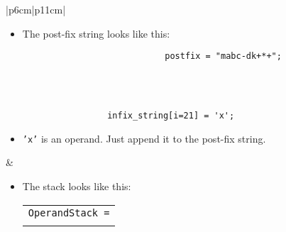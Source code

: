 \begin{center}
\begin{longtable}{ |p{6cm}|p{11cm}| }
\begin{itemize}
                \item The post-fix string looks like this:
                    {
                        \begin{verbatim}
                            postfix = "mabc-dk+*+";
                        \end{verbatim}
                    }
            \end{itemize}
        \\
        \hline 
        \hline
         \\
        \hline
        \hline        
            {
                \begin{verbatim}
                    infix_string[i=21] = 'x';
                \end{verbatim}
            }
            \begin{itemize}
                \item \texttt{'x'} is an operand. Just append it to the post-fix string.
            \end{itemize}
            &
            \begin{itemize}
                \item The stack looks like this: 
                    {
                        \begin{tabular}{ c }
                            \texttt{OperandStack =} \\ \\
                        \end{tabular}
                        \begin{bytefield}{10}
                             \\
                        \end{bytefield}
                    }
                

\end{itemize}
\end{longtable}
\end{center}
